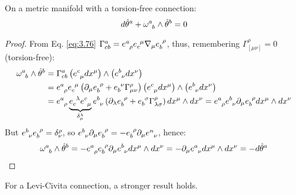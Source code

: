 \begin{theorem}[Cartan]
  On a metric manifold with a torsion-free connection:
  \begin{equation}
    d\hat{\theta}^a + \tensor{\omega}{^a_b} \wedge \hat{\theta}^b = 0
    \label{eq:3.79}
  \end{equation}
\end{theorem}
\begin{proof}
  From Eq. \ref{eq:3.76} $ \Gamma^a_{cb} = \tensor{e}{^a_\rho} \tensor{e}{_c^\mu} \na_\mu \tensor{e}{_b^\rho} $, thus, remembering $ \Gamma^\rho_{[\mu \nu]} = 0 $ (torsion-free):
  \begin{equation*}
    \begin{split}
      \tensor{\omega}{^a_b} \wedge \hat{\theta}^b
      &= \Gamma^a_{cb} \left( \tensor{e}{^c_\mu} dx^\mu \right) \wedge \left( \tensor{e}{^b_\nu} dx^\nu \right) \\
      &= \tensor{e}{^a_\rho} \tensor{e}{_c^\mu} \left( \pa_\mu \tensor{e}{_b^\rho} + \tensor{e}{_b^\nu} \Gamma^\rho_{\mu \nu} \right) \left( \tensor{e}{^c_\mu} dx^\mu \right) \wedge \left( \tensor{e}{^b_\nu} dx^\nu \right) \\
      &= \tensor{e}{^a_\rho} \underbrace{\tensor{e}{_c^\lambda} \tensor{e}{^c_\mu}}_{\delta_\mu^\lambda} \tensor{e}{^b_\nu} \left( \pa_\lambda \tensor{e}{_b^\rho} + \tensor{e}{_b^\sigma} \Gamma^\rho_{\lambda \sigma} \right) dx^\mu \wedge dx^\nu = \tensor{e}{^a_\rho} \tensor{e}{^b_\nu} \pa_\mu \tensor{e}{_b^\rho} dx^\mu \wedge dx^\nu
    \end{split}
  \end{equation*}
  But $ \tensor{e}{^b_\nu} \tensor{e}{_b^\rho} = \delta_\nu^\rho $, so $ \tensor{e}{^b_\nu} \pa_\mu \tensor{e}{_b^\rho} = - \tensor{e}{_b^\rho} \pa_\mu \tensor{e}{^n_\nu} $, hence:
  \begin{equation*}
    \tensor{\omega}{^a_b} \wedge \hat{\theta}^b = - \tensor{e}{^a_\rho} \tensor{e}{_b^\rho} \pa_\mu \tensor{e}{^b_\nu} dx^\mu \wedge dx^\nu = - \pa_\mu \tensor{e}{^a_\nu} dx^\mu \wedge dx^\nu = -d\hat{\theta}^a
  \end{equation*}
\end{proof}

For a Levi-Civita connection, a stronger result holds.

